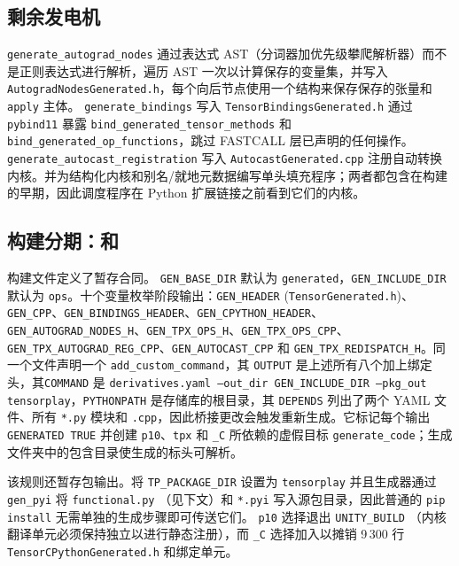 \subsection{剩余发电机}

\texttt{generate\_autograd\_nodes} 通过表达式 AST（分词器加优先级攀爬解析器）而不是正则表达式进行解析，遍历 AST 一次以计算保存的变量集，并写入 \texttt{AutogradNodesGenerated.h}，每个向后节点使用一个结构来保存保存的张量和 \texttt{apply} 主体。 \texttt{generate\_bindings} 写入 \texttt{TensorBindingsGenerated.h} 通过 \texttt{pybind11} 暴露 \texttt{bind\_generated\_tensor\_methods} 和 \texttt{bind\_generated\_op\_functions}，跳过 FASTCALL 层已声明的任何操作。 \texttt{generate\_autocast\_registration} 写入 \texttt{AutocastGenerated.cpp} 注册自动转换内核。并为结构化内核和别名/就地元数据编写单头填充程序；两者都包含在构建的早期，因此调度程序在 Python 扩展链接之前看到它们的内核。

\subsection{构建分期：和}

构建文件定义了暂存合同。 \texttt{GEN\_BASE\_DIR} 默认为 \texttt{generated}，\texttt{GEN\_INCLUDE\_DIR} 默认为 \texttt{ops}。十个变量枚举阶段输出：\texttt{GEN\_HEADER} (\texttt{TensorGenerated.h})、\texttt{GEN\_CPP}、\texttt{GEN\_BINDINGS\_HEADER}、\texttt{GEN\_CPYTHON\_HEADER}、\texttt{GEN\_AUTOGRAD\_NODES\_H}、\texttt{GEN\_TPX\_OPS\_H}、\texttt{GEN\_TPX\_OPS\_CPP}、\texttt{GEN\_TPX\_AUTOGRAD\_REG\_CPP}、\texttt{GEN\_AUTOCAST\_CPP} 和 \texttt{GEN\_TPX\_REDISPATCH\_H}。同一个文件声明一个 \texttt{add\_custom\_command}，其 \texttt{OUTPUT} 是上述所有八个加上绑定头，其\texttt{COMMAND} 是 \texttt{derivatives.yaml --out\_dir GEN\_INCLUDE\_DIR --pkg\_out tensorplay}，\texttt{PYTHONPATH} 是存储库的根目录，其 \texttt{DEPENDS} 列出了两个 YAML 文件、所有 \texttt{*.py} 模块和 \texttt{.cpp}，因此桥接更改会触发重新生成。它标记每个输出 \texttt{GENERATED TRUE} 并创建 \texttt{p10}、\texttt{tpx} 和 \texttt{\_C} 所依赖的虚假目标 \texttt{generate\_code}；生成文件夹中的包含目录使生成的标头可解析。

该规则还暂存包输出。将 \texttt{TP\_PACKAGE\_DIR} 设置为 \texttt{tensorplay} 并且生成器通过 \texttt{gen\_pyi} 将 \texttt{functional.py} （见下文）和 \texttt{*.pyi} 写入源包目录，因此普通的 \texttt{pip install} 无需单独的生成步骤即可传送它们。 \texttt{p10} 选择退出 \texttt{UNITY\_BUILD} （内核翻译单元必须保持独立以进行静态注册），而 \texttt{\_C} 选择加入以摊销 9\,300 行 \texttt{TensorCPythonGenerated.h} 和绑定单元。

